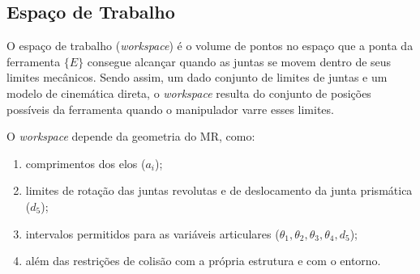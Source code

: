 \subsection{Espaço de Trabalho}

O espaço de trabalho (\emph{workspace}) é o volume de pontos no espaço que a ponta da ferramenta $\{E\}$ consegue alcançar quando as juntas se movem dentro de seus limites mecânicos.
Sendo assim, um dado conjunto de limites de juntas e um modelo de cinemática direta, o \emph{workspace} resulta do conjunto de posições possíveis da ferramenta quando o manipulador varre esses limites.

O \emph{workspace} depende da geometria do MR, como:
\begin{enumerate}[label=\roman*)]
    \item comprimentos dos elos ($a_i$);
    \item limites de rotação das juntas revolutas e de deslocamento da junta prismática ($d_5$);
    \item intervalos permitidos para as variáveis articulares ($\theta_1,\theta_2,\theta_3,\theta_4,d_5$);
    \item além das restrições de colisão com a própria estrutura e com o entorno.
\end{enumerate}

